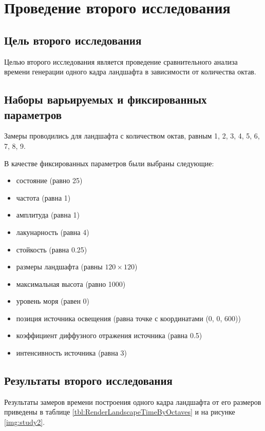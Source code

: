 \clearpage

\section{Проведение второго исследования}

\subsection{Цель второго исследования}

Целью второго исследования является проведение сравнительного анализа времени генерации одного кадра ландшафта в зависимости от количества октав. 

\subsection{Наборы варьируемых и фиксированных параметров}

Замеры проводились для ландшафта с количеством октав, равным 1, 2, 3, 4, 5, 6, 7, 8, 9.

В качестве фиксированных параметров были выбраны следующие:

\begin{itemize}[label=--]
	\item состояние (равно 25)
	\item частота (равна 1)
	\item амплитуда (равна 1)
	\item лакунарность (равна 4)
	\item стойкость (равна 0.25)
	\item размеры ландшафта (равны $120\times120$)
	\item максимальная высота (равно 1000)
	\item уровень моря (равен 0)
	\item позиция источника освещения (равна точке с координатами (0, 0, 600))
	\item коэффициент диффузного отражения источника (равна 0.5)
	\item интенсивность источника (равна 3)
\end{itemize}

\subsection{Результаты второго исследования}

Результаты замеров времени построения одного кадра ландшафта от его размеров приведены в таблице \ref{tbl:RenderLandscapeTimeByOctaves} и на рисунке \ref{img:study2}.

